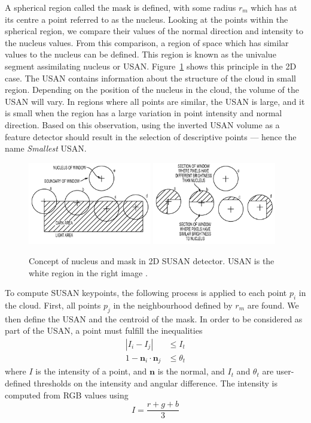 \documentclass[11pt,a4paper]{kth-mag}
\begin{document}
A spherical region called the mask is defined, with some radius $r_m$ which has
at its centre a point referred to as the nucleus. Looking at the points within
the spherical region, we compare their values of the normal direction and
intensity to the nucleus values. From this comparison, a region of space which
has similar values to the nucleus can be defined. This region is known as the
univalue segment assimilating nucleus or USAN. Figure~\ref{fig:susan_nucleus}
shows this principle in the 2D case. The USAN contains information about the
structure of the cloud in small region. Depending on the position of the nucleus
in the cloud, the volume of the USAN will vary. In regions where all points are
similar, the USAN is large, and it is small when the region has a large
variation in point intensity and normal direction. Based on this observation,
using the inverted USAN volume as a feature detector should result in the
selection of descriptive points --- hence the name \emph{Smallest} USAN.

\begin{figure}
  \centering
  \includegraphics[width=0.48\textwidth]{images/susan1}
  \includegraphics[width=0.48\textwidth]{images/susan}
  \caption{Concept of nucleus and mask in 2D SUSAN detector. USAN is the white
    region in the right image \cite{zhang2013susan}.}
  \label{fig:susan_nucleus}
\end{figure}

To compute SUSAN keypoints, the following process is applied to each point $p_i$
in the cloud. First, all points $p_j$ in the neighbourhood defined by $r_m$ are
found. We then define the USAN and the centroid of the mask. In order to be
considered as part of the USAN, a point must fulfill the inequalities
\begin{align}
  \label{eq:9}
  \left|I_i-I_j\right|&\leq I_t\\
  1-\mathbf{n}_i\cdot\mathbf{n}_j&\leq \theta_t
\end{align}
where $I$ is the intensity of a point, and $\mathbf{n}$ is the normal, and $I_t$
and $\theta_t$ are user-defined thresholds on the intensity and angular
difference. The intensity is computed from RGB values using
\begin{equation}
  \label{eq:10}
  I=\frac{r+g+b}{3}
\end{equation}
\end{document}
